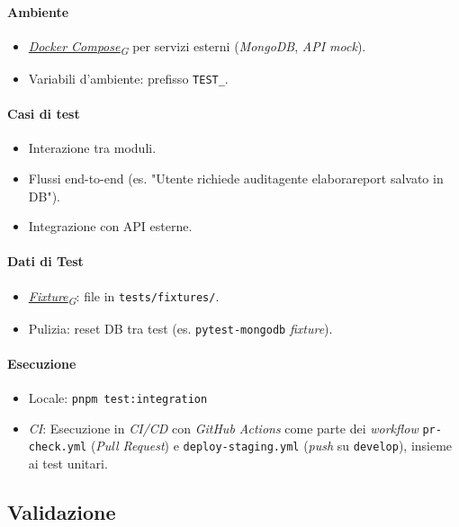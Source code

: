 \documentclass[12pt, a4paper]{article}
\newcommand{\urlglossario}{https://skynetunigroup.github.io/Code_Guardian/Documentazione/PB/glossario_v2.0.0.pdf} %
\newcommand{\glo}[2]{\href{\urlglossario\#nameddest=#2}{#1\textsubscript{G}}}
\begin{document}
\paragraph{Ambiente}
\begin{itemize}
    \item \textit{\glo{Docker Compose}{docker-compose}} per servizi esterni (\textit{MongoDB}, \textit{API mock}).
    \item Variabili d'ambiente: prefisso \texttt{TEST\_}.
\end{itemize}

\paragraph{Casi di test}
\begin{itemize}
    \item Interazione tra moduli.
    \item Flussi end-to-end (es. "Utente richiede audit\textrightarrow agente elabora\textrightarrow report salvato in DB").
    \item Integrazione con API esterne.
\end{itemize}

\paragraph{Dati di Test}
\begin{itemize}
    \item \textit{\glo{Fixture}{fixture}}: file in \texttt{tests/fixtures/}.
    \item Pulizia: reset DB tra test (es. \texttt{pytest-mongodb} \textit{fixture}).
\end{itemize}

\paragraph{Esecuzione}
\begin{itemize}
    \item Locale: \texttt{pnpm test:integration}
    \item \textit{CI}: Esecuzione in \textit{CI/CD} con \textit{GitHub Actions} come parte dei \textit{workflow} \texttt{pr-check.yml} (\textit{Pull Request}) e \texttt{deploy-staging.yml} (\textit{push} su \texttt{develop}), insieme ai test unitari.
\end{itemize}

\newpage
\subsection{Validazione}
\end{document}
